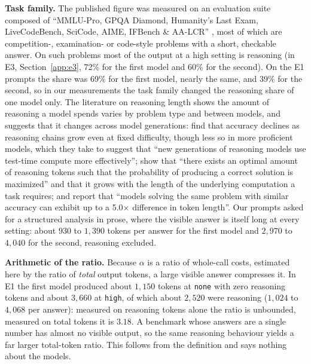 \documentclass[11pt]{article}
\begin{document}
\textbf{Task family.} The published figure was measured on an evaluation suite composed of
``MMLU-Pro, GPQA Diamond, Humanity's Last Exam, LiveCodeBench, SciCode, AIME, IFBench
\& AA-LCR'' \citep{aagpt5benchmarks2025}, most of which are competition-, examination- or
code-style problems with a short, checkable answer. On such problems most of the
output at a high setting is reasoning (in E3, Section~\ref{app:e3}, 72\% for the first model and 60\% for the second). On the E1 prompts the share was 69\% for the first model, nearly the same, and 39\% for the second, so in our measurements the task family changed the reasoning share of one model only. The literature on reasoning length shows the
amount of reasoning a model spends varies by problem type and between models, and suggests that it changes across model generations:
\citet{ballon2026thinksharder} find that accuracy declines as reasoning chains grow even at fixed difficulty, though less so in more proficient models, which they take to suggest that ``new generations of reasoning models use test-time compute more effectively''; \citet{lee2025critical} show that ``there exists an optimal amount of
reasoning tokens such that the probability of producing a correct solution is maximized''
and that it grows with the length of the underlying computation a task requires; and
\citet{du2025ockbench} report that ``models solving the same
problem with similar accuracy can exhibit up to a 5.0$\times$ difference in token
length''. Our prompts asked for a structured analysis in prose, where the visible answer
is itself long at every setting: about $930$ to $1{,}390$ tokens per answer for the first model and $2{,}970$ to $4{,}040$ for the second, reasoning excluded.

\textbf{Arithmetic of the ratio.} Because $\alpha$ is a ratio of whole-call costs, estimated here by the ratio of \emph{total} output
tokens, a large visible answer compresses it. In E1 the first model produced about $1{,}150$
tokens at \texttt{none} with zero reasoning tokens and about $3{,}660$ at \texttt{high}, of
which about $2{,}520$ were reasoning ($1{,}024$ to $4{,}068$ per answer): measured on reasoning tokens alone the ratio is
unbounded, measured on total tokens it is $3.18$. A benchmark whose answers are a single
number has almost no visible output, so the same reasoning behaviour yields a far larger
total-token ratio. This follows from the definition and says nothing about the models.
\end{document}
